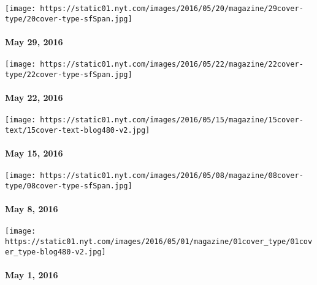 \href{http://www.nytimes.com/indexes/2016/05/29/magazine/index.html}{}

\texttt{[image: https://static01.nyt.com/images/2016/05/20/magazine/29cover-type/20cover-type-sfSpan.jpg]}

\hypertarget{may-29-2016}{%
\paragraph{May 29, 2016}\label{may-29-2016}}

\href{http://www.nytimes.com/indexes/2016/05/22/magazine/index.html}{}

\texttt{[image: https://static01.nyt.com/images/2016/05/22/magazine/22cover-type/22cover-type-sfSpan.jpg]}

\hypertarget{may-22-2016}{%
\paragraph{May 22, 2016}\label{may-22-2016}}

\href{http://www.nytimes.com/indexes/2016/05/15/magazine/index.html}{}

\texttt{[image: https://static01.nyt.com/images/2016/05/15/magazine/15cover-text/15cover-text-blog480-v2.jpg]}

\hypertarget{may-15-2016}{%
\paragraph{May 15, 2016}\label{may-15-2016}}

\href{http://www.nytimes.com/indexes/2016/05/05/magazine/index.html}{}

\texttt{[image: https://static01.nyt.com/images/2016/05/08/magazine/08cover-type/08cover-type-sfSpan.jpg]}

\hypertarget{may-8-2016}{%
\paragraph{May 8, 2016}\label{may-8-2016}}

\href{http://www.nytimes.com/indexes/2016/05/01/magazine/index.html}{}

\texttt{[image: https://static01.nyt.com/images/2016/05/01/magazine/01cover\_type/01cover\_type-blog480-v2.jpg]}

\hypertarget{may-1-2016}{%
\paragraph{May 1, 2016}\label{may-1-2016}}

